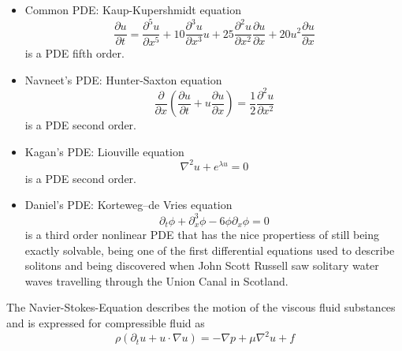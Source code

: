 \newcommand{\assignmentDate}{October 28th, 2019}



\begin{itemize}
	\item Common PDE: Kaup-Kupershmidt equation
		\begin{equation}
			\frac{\partial u }{\partial t} = \frac{\partial ^5 u}{\partial x^5} + 10 \frac{\partial ^3 u}{\partial x^3} u + 25 \frac{\partial ^2 u}{\partial x^2} \frac{\partial u}{\partial x} + 20 u^2 \frac{\partial u}{\partial x}
		\end{equation}
		\hspace{2.4cm} is a PDE fifth order.
	
	\item Navneet's PDE: Hunter-Saxton equation
		\begin{equation}
			\frac{\partial}{\partial x} \left( \frac{\partial u }{\partial t} + u \frac{\partial u}{\partial x} \right) = \frac{1}{2} \frac{\partial ^2 u}{\partial x^2}
		\end{equation}
		\hspace{2.4cm} is a PDE second order.
	\item Kagan's PDE: Liouville equation
		\begin{equation}
			\nabla ^2 u + e ^{\lambda u} = 0
		\end{equation}
		\hspace{2.4cm} is a PDE second order.
	\item Daniel's PDE: Korteweg–de Vries equation
		\begin{equation}
			\partial_t\phi+\partial_x^3\phi-6\phi\partial_x\phi=0
		\end{equation}
		\hspace{2.4cm} is a third order nonlinear PDE that has the nice propertiess of still being exactly solvable, being one of the first differential equations used to describe solitons and being discovered when John Scott Russell saw solitary water waves travelling through the Union Canal in Scotland.
		
\end{itemize}
%
The Navier-Stokes-Equation describes the motion of the viscous fluid substances and is expressed for compressible fluid as
\begin{equation}
	\rho(\partial_t u + u \cdot \nabla u) = - \nabla p + \mu \nabla ^2 u + f
	\label{eq:NavStokes}
\end{equation}

